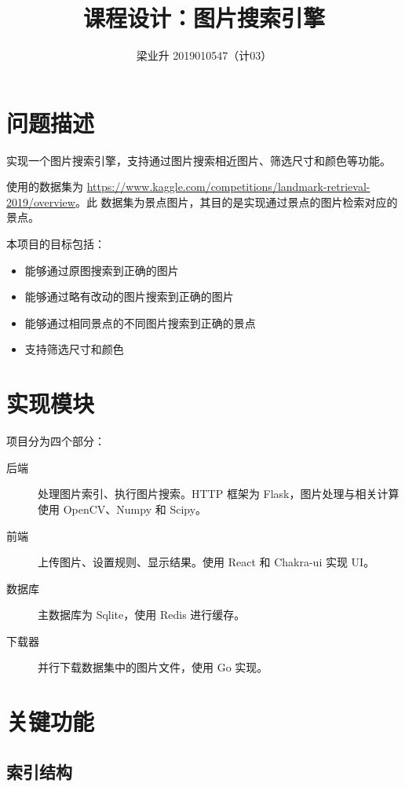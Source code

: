 \documentclass[a4paper]{article}
\begin{document}
\title{课程设计：图片搜索引擎}
\author{梁业升 2019010547（计03）}

\maketitle

\section{问题描述}\label{sec:problem}

实现一个图片搜索引擎，支持通过图片搜索相近图片、筛选尺寸和颜色等功能。

使用的数据集为 \hyperlink{Google Landmark Retrieval 2019}{https://www.kaggle.com/competitions/landmark-retrieval-2019/overview}。此
数据集为景点图片，其目的是实现通过景点的图片检索对应的景点。

本项目的目标包括：

\begin{itemize}
    \item 能够通过原图搜索到正确的图片
    \item 能够通过略有改动的图片搜索到正确的图片
    \item 能够通过相同景点的不同图片搜索到正确的景点
    \item 支持筛选尺寸和颜色
\end{itemize}

\section{实现模块}

项目分为四个部分：

\begin{description}
    \item[后端] 处理图片索引、执行图片搜索。HTTP 框架为 Flask，图片处理与相关计算使用 OpenCV、Numpy 和 Scipy。
    \item[前端] 上传图片、设置规则、显示结果。使用 React 和 Chakra-ui 实现 UI。
    \item[数据库] 主数据库为 Sqlite，使用 Redis 进行缓存。
    \item[下载器] 并行下载数据集中的图片文件，使用 Go 实现。
\end{description}

\section{关键功能}

\subsection{索引结构}
\end{document}
